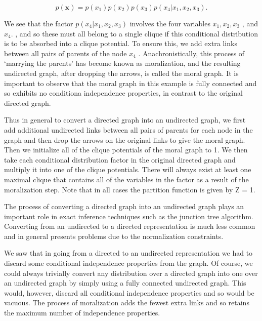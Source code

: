 \documentclass[
  10
]{article}
\begin{document}
\[
p (\mathbf {x}) = p (x _ {1}) p (x _ {2}) p (x _ {3}) p (x _ {4} | x _ {1}, x _ {2}, x _ {3}).\tag{8.46}
\]

We see that the factor
\(p ( x _ { 4 } | x _ { 1 } , x _ { 2 } , x _ { 3 } )\) involves the
four variables \(x _ { 1 } , x _ { 2 } , x _ { 3 }\) , and
\(x _ { 4 } .\) , and so these must all belong to a single clique if
this conditional distribution is to be absorbed into a clique potential.
To ensure this, we add extra links between all pairs of parents of the
node \(x _ { 4 }\) . Anachronistically, this process of `marrying the
parents' has become known as moralization, and the resulting undirected
graph, after dropping the arrows, is called the moral graph. It is
important to observe that the moral graph in this example is fully
connected and so exhibits no conditiona independence properties, in
contrast to the original directed graph.

Thus in general to convert a directed graph into an undirected graph, we
first add additional undirected links between all pairs of parents for
each node in the graph and then drop the arrows on the original links to
give the moral graph. Then we initialize all of the clique potentials of
the moral graph to 1. We then take each conditional distribution factor
in the original directed graph and multiply it into one of the clique
potentials. There will always exist at least one maximal clique that
contains all of the variables in the factor as a result of the
moralization step. Note that in all cases the partition function is
given by Z = 1.

The process of converting a directed graph into an undirected graph
plays an important role in exact inference techniques such as the
junction tree algorithm. Converting from an undirected to a directed
representation is much less common and in general presents problems due
to the normalization constraints.

We saw that in going from a directed to an undirected representation we
had to discard some conditional independence properties from the graph.
Of course, we could always trivially convert any distribution over a
directed graph into one over an undirected graph by simply using a fully
connected undirected graph. This would, however, discard all conditional
independence properties and so would be vacuous. The process of
moralization adds the fewest extra links and so retains the maximum
number of independence properties.
\end{document}

